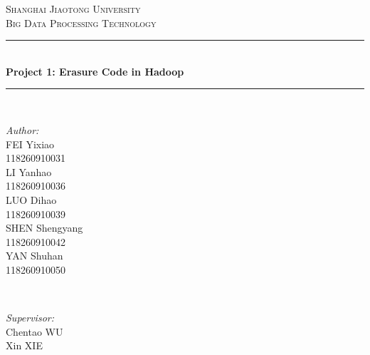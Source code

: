 \documentclass[10pt]{article}
\begin{document}
\begin{titlepage}

\newcommand{\HRule}{\rule{\linewidth}{0.5mm}} %

\center %


\textsc{\LARGE Shanghai Jiaotong University}\\[1.5cm] %
\textsc{\Large Big Data Processing Technology}\\[0.5cm] %


\HRule \\[0.4cm]
{ \huge \bfseries Project 1: Erasure Code in Hadoop}\\[0.4cm] %
\HRule \\[1.5cm]


\begin{minipage}{0.4\textwidth}
\begin{flushleft} \large
\emph{Author:}\\
FEI Yixiao \\118260910031\\
LI Yanhao \\118260910036\\
LUO Dihao \\118260910039\\ %
SHEN Shengyang \\118260910042\\
YAN Shuhan \\118260910050\\ %
\end{flushleft}
\end{minipage}
~
\begin{minipage}{0.4\textwidth}
\begin{flushright} \large
\emph{Supervisor:} \\
Chentao  \textsc{WU} \\%
Xin  \textsc{XIE}
\end{flushright}
\end{minipage}\\[2cm]


\end{titlepage}
\end{document}
